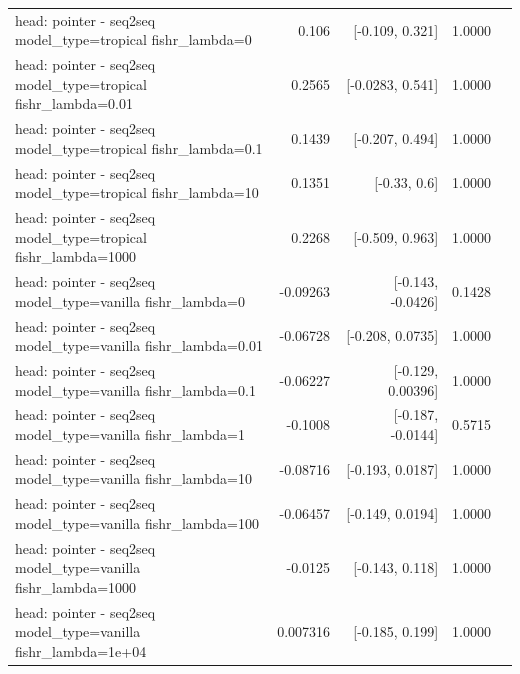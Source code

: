 \documentclass[10pt]{article}
\makeatletter
\newcommand{\stackcell}[1]{\begin{tabular}[t]{@{}l@{}}#1\end{tabular}}
\makeatother
\begin{document}
{\begin{longtable}{lrrrl}
\stackcell{head: pointer - seq2seq\\\footnotesize model\_type=tropical fishr\_lambda=0 } & 0.106 & [-0.109, 0.321] & 1.0000 & \\
\stackcell{head: pointer - seq2seq\\\footnotesize model\_type=tropical fishr\_lambda=0.01 } & 0.2565 & [-0.0283, 0.541] & 1.0000 & \\
\stackcell{head: pointer - seq2seq\\\footnotesize model\_type=tropical fishr\_lambda=0.1 } & 0.1439 & [-0.207, 0.494] & 1.0000 & \\
\stackcell{head: pointer - seq2seq\\\footnotesize model\_type=tropical fishr\_lambda=10 } & 0.1351 & [-0.33, 0.6] & 1.0000 & \\
\stackcell{head: pointer - seq2seq\\\footnotesize model\_type=tropical fishr\_lambda=1000 } & 0.2268 & [-0.509, 0.963] & 1.0000 & \\
\stackcell{head: pointer - seq2seq\\\footnotesize model\_type=vanilla fishr\_lambda=0 } & -0.09263 & [-0.143, -0.0426] & 0.1428 & \\
\stackcell{head: pointer - seq2seq\\\footnotesize model\_type=vanilla fishr\_lambda=0.01 } & -0.06728 & [-0.208, 0.0735] & 1.0000 & \\
\stackcell{head: pointer - seq2seq\\\footnotesize model\_type=vanilla fishr\_lambda=0.1 } & -0.06227 & [-0.129, 0.00396] & 1.0000 & \\
\stackcell{head: pointer - seq2seq\\\footnotesize model\_type=vanilla fishr\_lambda=1 } & -0.1008 & [-0.187, -0.0144] & 0.5715 & \\
\stackcell{head: pointer - seq2seq\\\footnotesize model\_type=vanilla fishr\_lambda=10 } & -0.08716 & [-0.193, 0.0187] & 1.0000 & \\
\stackcell{head: pointer - seq2seq\\\footnotesize model\_type=vanilla fishr\_lambda=100 } & -0.06457 & [-0.149, 0.0194] & 1.0000 & \\
\stackcell{head: pointer - seq2seq\\\footnotesize model\_type=vanilla fishr\_lambda=1000 } & -0.0125 & [-0.143, 0.118] & 1.0000 & \\
\stackcell{head: pointer - seq2seq\\\footnotesize model\_type=vanilla fishr\_lambda=1e+04 } & 0.007316 & [-0.185, 0.199] & 1.0000 & \\
\bottomrule
\end{longtable}
}
\end{document}
